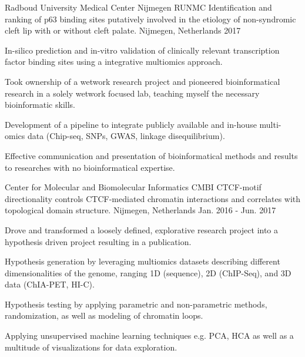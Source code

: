 

\begin{cventries}

  \cventry
    {Radboud University Medical Center Nijmegen RUNMC} %
    {Identification and ranking of p63 binding sites putatively
    involved in the etiology of non-syndromic cleft lip with or
    without cleft palate.} %
    {Nijmegen, Netherlands} %
    {2017} %
    {
      \begin{cvitems} %
        \item {In-silico prediction and in-vitro validation of clinically relevant transcription factor binding sites using a integrative multiomics approach.}
        \item {Took ownership of a wetwork research project and pioneered bioinformatical research in a solely wetwork focused lab, teaching myself the necessary bioinformatic skills.}
        \item {Development of a pipeline to integrate publicly available and in-house multi-omics data (Chip-seq, SNPs, GWAS, linkage disequilibrium).}
        \item {Effective communication and presentation of bioinformatical methods and results to researches with no bioinformatical expertise.}
      \end{cvitems}
    }

  \cventry
    {Center for Molecular and Biomolecular Informatics CMBI} %
    {CTCF-motif directionality controls CTCF-mediated chromatin interactions
    and correlates with topological domain structure.} %
    {Nijmegen, Netherlands} %
    {Jan. 2016 - Jun. 2017} %
    {
      \begin{cvitems} %
        \item {Drove and transformed a loosely defined, explorative research project into a hypothesis driven project resulting in a publication.}
        \item {Hypothesis generation by leveraging multiomics datasets describing different dimensionalities of the genome, ranging 1D (sequence), 2D (ChIP-Seq), and 3D data (ChIA-PET, HI-C).}
        \item {Hypothesis testing by applying parametric and non-parametric methods, randomization, as well as modeling of chromatin loops.}
        \item {Applying unsupervised machine learning techniques e.g. PCA, HCA as well as a multitude of visualizations for data exploration.}
      \end{cvitems}
    }
\end{cventries}
